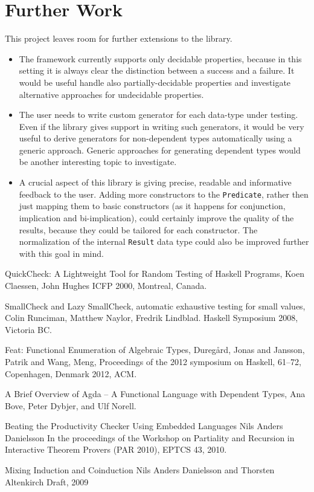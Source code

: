\documentclass[10pt,a4paper]{article}
\begin{document}
\section{Further Work}
This project leaves room for further extensions to the library.
\begin{itemize}
	\item The framework currently supports only decidable properties, because in this setting it is always clear the distinction between a success and a failure. 	It would be useful handle also partially-decidable properties and investigate alternative approaches for undecidable properties.	
	
	\item The user needs to write custom generator for each data-type under testing. Even if the library gives support in writing such generators, it would be very useful to derive generators for non-dependent types automatically using a generic approach. Generic approaches for generating dependent types would be another interesting topic to investigate.
	
	\item A crucial aspect of this library is giving precise, readable and informative feedback to the user. Adding more constructors to the \texttt{Predicate}, rather then just mapping them to basic constructors (as it happens for conjunction, implication and bi-implication), could certainly improve the quality of the results, because they could be tailored for each constructor. The normalization of the internal \texttt{Result} data type could also be improved further with this goal in mind.
\end{itemize}

\begin{thebibliography}{1}
		
	QuickCheck: A Lightweight Tool for Random Testing of Haskell Programs,
	Koen Claessen, John Hughes
	ICFP 2000, Montreal, Canada.
	
	SmallCheck and Lazy SmallCheck, automatic exhaustive testing for small values,
	Colin Runciman, Matthew Naylor, Fredrik Lindblad.
	Haskell Symposium 2008, Victoria BC.
	
	Feat: Functional Enumeration of Algebraic Types,
  	Dureg{\aa}rd, Jonas   and   Jansson, Patrik   and   Wang, Meng,
  	Proceedings of the 2012 symposium on Haskell, 61--72,
	Copenhagen, Denmark
	2012, ACM.

	A Brief Overview of Agda – A Functional Language with Dependent Types,
	Ana Bove, Peter Dybjer, and Ulf Norell.
	
	Beating the Productivity Checker Using Embedded Languages
	Nils Anders Danielsson
	In the proceedings of the Workshop on Partiality and Recursion in Interactive Theorem Provers (PAR 2010), EPTCS 43, 2010.

	Mixing Induction and Coinduction
	Nils Anders Danielsson and Thorsten Altenkirch
	Draft, 2009

\end{thebibliography}
\end{document}
